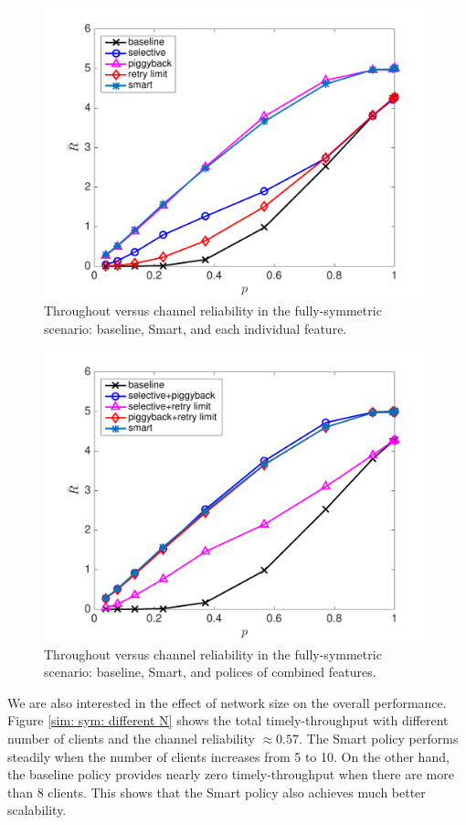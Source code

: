 \documentclass{article}
\begin{document}
\begin{figure}[htbp]
\centering
\includegraphics[scale=0.5]{3policycompare_sym.pdf}
\caption{Throughout versus channel reliability in the fully-symmetric scenario: baseline, Smart, and each individual feature.}
\label{sim: sym: three features}
\end{figure}
\begin{figure}[htbp]
\centering
\includegraphics[scale=0.5]{sym_threecombinepolicys.pdf}
\caption{Throughout versus channel reliability in the fully-symmetric scenario: baseline, Smart, and polices of combined features.}
\label{sim: sym: combined}
\end{figure}

We are also interested in the effect of network size on the overall performance. Figure \ref{sim: sym: different N} shows the total timely-throughput with different number of clients and the channel reliability $\approx 0.57$. The Smart policy performs steadily when the number of clients increases from 5 to 10. On the other hand, the baseline policy provides nearly zero timely-throughput when there are more than 8 clients. This shows that the Smart policy also achieves much better scalability.
\end{document}
